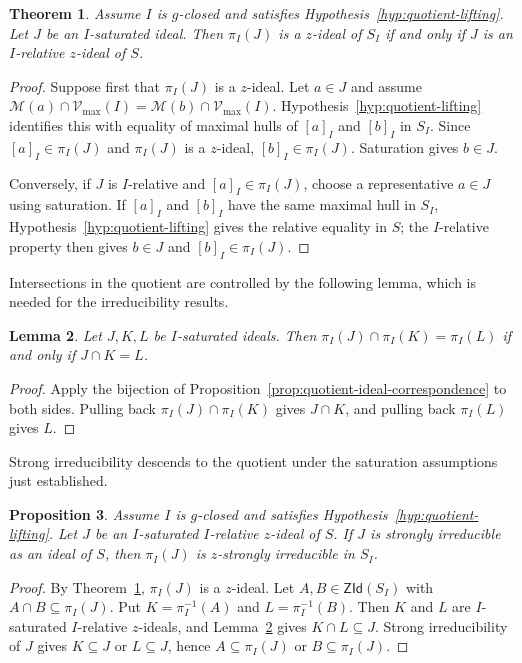 \documentclass[11pt,leqno]{amsart}
\theoremstyle{plain}
\newtheorem{theorem}{Theorem}[section]
\newtheorem{proposition}[theorem]{Proposition}
\newtheorem{lemma}[theorem]{Lemma}
\theoremstyle{definition}
\theoremstyle{remark}
\numberwithin{equation}{section}
\newcommand{\ZId}{\mathsf{ZId}}
\newcommand{\M}{\mathcal M}
\begin{document}
\begin{theorem}\label{loc11}
Assume $I$ is $g$-closed and satisfies
Hypothesis~\ref{hyp:quotient-lifting}.
Let $J$ be an $I$-saturated ideal.
Then $\pi_I(J)$ is a $z$-ideal of $S_I$ if and only if
$J$ is an $I$-relative $z$-ideal of $S$.
\end{theorem}
\begin{proof}
Suppose first that $\pi_I(J)$ is a $z$-ideal.
Let $a\in J$ and assume
$\M(a)\cap\mathcal{V}_{\max}(I)=\M(b)\cap\mathcal{V}_{\max}(I)$.
Hypothesis~\ref{hyp:quotient-lifting} identifies this with equality
of maximal hulls of $[a]_I$ and $[b]_I$ in $S_I$.
Since $[a]_I\in\pi_I(J)$ and $\pi_I(J)$ is a $z$-ideal,
$[b]_I\in\pi_I(J)$.
Saturation gives $b\in J$.

Conversely, if $J$ is $I$-relative and $[a]_I\in\pi_I(J)$,
choose a representative $a\in J$ using saturation.
If $[a]_I$ and $[b]_I$ have the same maximal hull in $S_I$,
Hypothesis~\ref{hyp:quotient-lifting} gives the relative equality
in $S$; the $I$-relative property then gives $b\in J$ and
$[b]_I\in\pi_I(J)$.
\end{proof}

Intersections in the quotient are controlled by the following lemma,
which is needed for the irreducibility results.

\begin{lemma}\label{loc10}
Let $J,K,L$ be $I$-saturated ideals.  Then
$\pi_I(J)\cap\pi_I(K)=\pi_I(L)$ if and only if $J\cap K=L$.
\end{lemma}
\begin{proof}
Apply the bijection of Proposition~\ref{prop:quotient-ideal-correspondence}
to both sides.
Pulling back $\pi_I(J)\cap\pi_I(K)$ gives $J\cap K$,
and pulling back $\pi_I(L)$ gives $L$.
\end{proof}

Strong irreducibility descends to the quotient under the saturation
assumptions just established.

\begin{proposition}\label{prop:quotient-strong-irred}
Assume $I$ is $g$-closed and satisfies
Hypothesis~\ref{hyp:quotient-lifting}.
Let $J$ be an $I$-saturated $I$-relative $z$-ideal of $S$.
If $J$ is strongly irreducible as an ideal of $S$,
then $\pi_I(J)$ is $z$-strongly irreducible in $S_I$.
\end{proposition}
\begin{proof}
By Theorem~\ref{loc11}, $\pi_I(J)$ is a $z$-ideal.
Let $A,B\in\ZId(S_I)$ with $A\cap B\subseteq\pi_I(J)$.
Put $K=\pi_I^{-1}(A)$ and $L=\pi_I^{-1}(B)$.
Then $K$ and $L$ are $I$-saturated $I$-relative $z$-ideals,
and Lemma~\ref{loc10} gives $K\cap L\subseteq J$.
Strong irreducibility of $J$ gives $K\subseteq J$ or $L\subseteq J$,
hence $A\subseteq\pi_I(J)$ or $B\subseteq\pi_I(J)$.
\end{proof}
\end{document}
